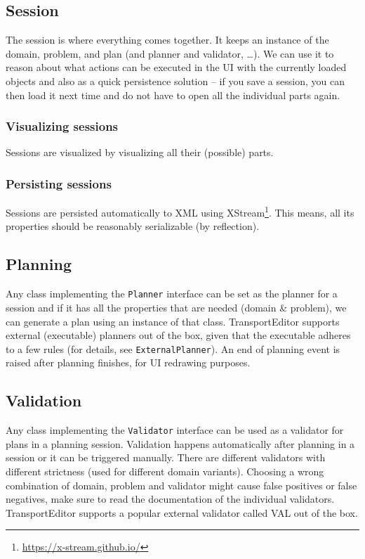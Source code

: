 \subsection*{Session}
The session is where everything comes together. It keeps an instance of the domain, problem, and plan (and planner and
validator, \ldots). We can use it to reason about what actions can be executed in the UI with the currently loaded
objects and also as a quick persistence solution -- if you save a session, you can then load it next time and
do not have to open all the individual parts again.

\subsubsection*{Visualizing sessions}

Sessions are visualized by visualizing all their (possible) parts.

\subsubsection*{Persisting sessions}
Sessions are persisted automatically to XML using XStream\footnote{\url{https://x-stream.github.io/}}. This means, all its properties
should be reasonably serializable (by reflection).

\subsection*{Planning}
Any class implementing the \texttt{Planner} interface can be set as the planner for a session and if it has all the properties
that are needed (domain \& problem), we can generate a plan using an instance of that class. TransportEditor supports
external (executable) planners out of the box, given that the executable adheres to a few rules (for details, see
\texttt{ExternalPlanner}). An end of planning event is raised after planning finishes, for UI redrawing purposes.

\subsection*{Validation}
Any class implementing the \texttt{Validator} interface can be used as a validator for plans in a planning session.
Validation happens automatically after planning in a session or it can be triggered manually. There are different
validators with different strictness (used for different domain variants). Choosing a wrong combination of domain,
problem and validator might cause false positives or false negatives, make sure to read the documentation of the
individual validators. TransportEditor supports a popular external validator called VAL \citep{Howey2003} out of the box.

